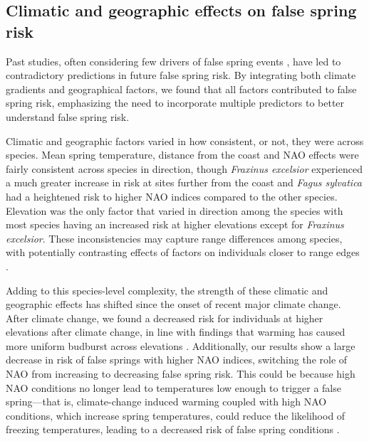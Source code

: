 \documentclass{article}\usepackage[]{graphicx}\usepackage[]{color}
\begin{document}
\subsection*{Climatic and geographic effects on false spring risk}
Past studies, often considering few drivers of false spring events \citep{Wypych2016a,Liu2018, Ma2018, Vitasse2018}, have led to contradictory predictions in future false spring risk. By integrating both climate gradients and geographical factors, we found that all factors contributed to false spring risk, emphasizing the need to incorporate multiple predictors to better understand false spring risk. 

Climatic and geographic factors varied in how consistent, or not, they were across species. Mean spring temperature, distance from the coast and NAO effects were fairly consistent across species in direction, though \textit{Fraxinus excelsior} experienced a much greater increase in risk at sites further from the coast and \textit{Fagus sylvatica} had a heightened risk to higher NAO indices compared to the other species. Elevation was the only factor that varied in direction among the species with most species having an increased risk at higher elevations except for \textit{Fraxinus excelsior}. These inconsistencies may capture range differences among species, with potentially contrasting effects of factors on individuals closer to range edges \citep{Chuine2008}. 

Adding to this species-level complexity, the strength of these climatic and geographic effects has shifted since the onset of recent major climate change. After climate change, we found a decreased risk for individuals at higher elevations after climate change, in line with findings that warming has caused more uniform budburst across elevations \citep{Vitasse2018}. Additionally, our results show a large decrease in risk of false springs with higher NAO indices, switching the role of NAO from increasing to decreasing false spring risk. This could be because high NAO conditions no longer lead to temperatures low enough to trigger a false spring---that is, climate-change induced warming coupled with high NAO conditions, which increase spring temperatures, could reduce the likelihood of freezing
temperatures, leading to a decreased risk of false spring conditions \citep{Screen2017}. 
\end{document}
